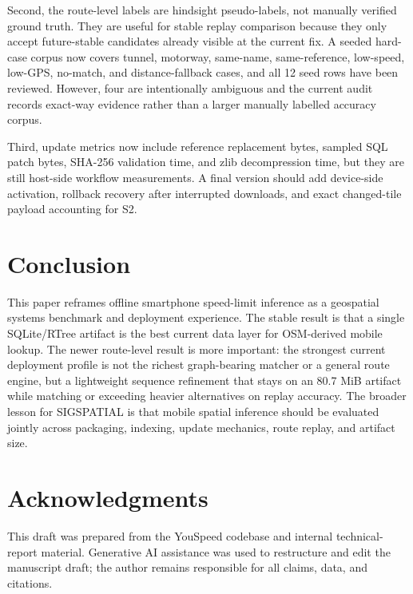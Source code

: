 \documentclass[sigconf]{acmart}
\begin{document}
Second, the route-level labels are hindsight pseudo-labels, not manually verified ground truth. They are useful for stable replay comparison because they only accept future-stable candidates already visible at the current fix. A seeded hard-case corpus now covers tunnel, motorway, same-name, same-reference, low-speed, low-GPS, no-match, and distance-fallback cases, and all 12 seed rows have been reviewed. However, four are intentionally ambiguous and the current audit records exact-way evidence rather than a larger manually labelled accuracy corpus.

Third, update metrics now include reference replacement bytes, sampled SQL patch bytes, SHA-256 validation time, and zlib decompression time, but they are still host-side workflow measurements. A final version should add device-side activation, rollback recovery after interrupted downloads, and exact changed-tile payload accounting for S2.

\section{Conclusion}

This paper reframes offline smartphone speed-limit inference as a geospatial systems benchmark and deployment experience. The stable result is that a single SQLite/RTree artifact is the best current data layer for OSM-derived mobile lookup. The newer route-level result is more important: the strongest current deployment profile is not the richest graph-bearing matcher or a general route engine, but a lightweight sequence refinement that stays on an 80.7 MiB artifact while matching or exceeding heavier alternatives on replay accuracy. The broader lesson for SIGSPATIAL is that mobile spatial inference should be evaluated jointly across packaging, indexing, update mechanics, route replay, and artifact size.

\section*{Acknowledgments}

This draft was prepared from the YouSpeed codebase and internal technical-report material. Generative AI assistance was used to restructure and edit the manuscript draft; the author remains responsible for all claims, data, and citations.



\end{document}
